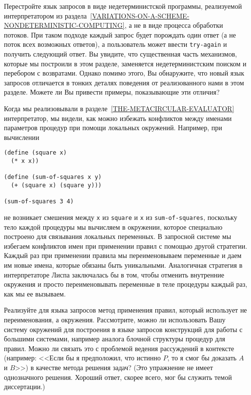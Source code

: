 \begin{exercise}{4.78}%
\label{EX4.78}%
%
Перестройте язык запросов в виде недетерминистской программы, реализуемой интерпретатором из 
раздела~\ref{VARIATIONS-ON-A-SCHEME-NONDETERMINISTIC-COMPUTING}, а
не в виде процесса обработки потоков.  При таком подходе каждый запрос
будет порождать один ответ (а не поток всех возможных ответов), а
пользователь может ввести {\tt try-again} и получить следующий
ответ.  Вы увидите, что существенная часть механизмов, которые мы
построили в этом разделе, заменяется недетерминистским поиском и
перебором с возвратами.  Однако помимо этого, Вы обнаружите, что новый
язык запросов отличается в тонких деталях поведения от реализованного
нами в этом разделе.  Можете ли Вы привести примеры, показывающие эти
отличия?
\end{exercise}

\begin{exercise}{4.79}%
\label{EX4.79}%
Когда мы реализовывали в
разделе~\ref{THE-METACIRCULAR-EVALUATOR} интерпретатор, 
мы видели,
как можно избежать конфликтов между именами параметров процедур при
помощи локальных окружений.  Например, при вычислении

\begin{Verbatim}[fontsize=\small]
(define (square x)
  (* x x))

(define (sum-of-squares x y)
  (+ (square x) (square y)))

(sum-of-squares 3 4)
\end{Verbatim}
не возникает смешения между {\tt x} из {\tt square} и
{\tt x} из {\tt sum-of-squares}, поскольку тело каждой
процедуры мы вычисляем в окружении, которое специально построено для
связывания локальных переменных.  В запросной системе мы избегаем
конфликтов имен при применении правил с помощью другой стратегии.
Каждый раз при применении правила мы переименовываем переменные и даем
им новые имена, которые обязаны быть уникальными.  Аналогичная
стратегия в интерпретаторе Лиспа заключалась бы в том, чтобы отменить
внутренние окружения и просто переименовывать переменные в теле
процедуры каждый раз, как мы ее вызываем.

  Реализуйте для языка
запросов метод применения правил, 
который использует не переименования, а окружения.  Рассмотрите, можно
ли использовать Вашу систему окружений для построения в языке запросов
конструкций для работы с большими системами, например аналога блочной
структуры процедур для правил.  Можно ли связать это с проблемой ведения
рассуждений в 
контексте (например: <<Если бы я предположил, что
истинно $P$, то я смог бы доказать $A$ и
$B$>>) в качестве метода решения задач?  (Это упражнение
не имеет однозначного решения.  Хороший ответ, скорее всего, мог бы
служить темой диссертации.)
\end{exercise}
